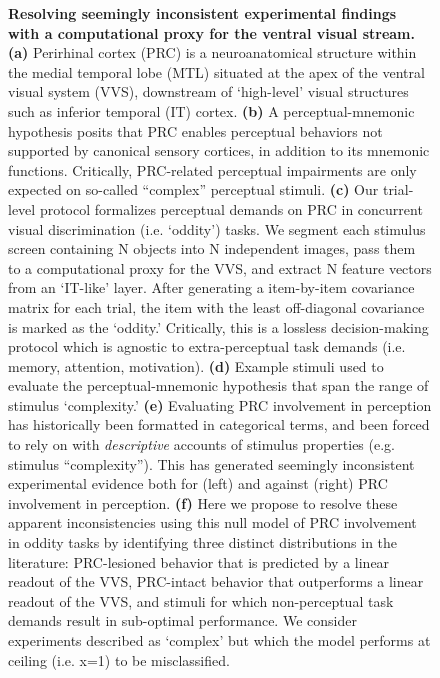 \documentclass[11pt]{article}
\begin{document}
\begin{figure}[ht]
\caption{\textbf{Resolving seemingly inconsistent experimental findings with a computational proxy for the ventral visual stream. (a)} Perirhinal cortex (PRC) is a neuroanatomical structure within the medial temporal lobe (MTL) situated at the apex of the ventral visual system (VVS), downstream of `high-level' visual structures such as inferior temporal (IT) cortex. \textbf{(b)} A perceptual-mnemonic hypothesis posits that PRC enables perceptual behaviors not supported by canonical sensory cortices, in addition to its mnemonic functions. Critically, PRC-related perceptual impairments are only expected on so-called ``complex'' perceptual stimuli. \textbf{(c)} Our trial-level protocol formalizes perceptual demands on PRC in concurrent visual discrimination (i.e. `oddity') tasks. We segment each stimulus screen containing N objects into N independent images, pass them to a computational proxy for the VVS, and extract N feature vectors from an `IT-like' layer. After generating a item-by-item covariance matrix for each trial, the item with the least off-diagonal covariance is marked as the `oddity.' Critically, this is a lossless decision-making protocol which is agnostic to extra-perceptual task demands (i.e. memory, attention, motivation). \textbf{(d)} Example stimuli used to evaluate the perceptual-mnemonic hypothesis that span the range of stimulus `complexity.' \textbf{(e)} Evaluating PRC involvement in perception has historically been formatted in categorical terms, and been forced to rely on with \emph{descriptive} accounts of stimulus properties (e.g. stimulus ``complexity''). This has generated seemingly inconsistent experimental evidence both for (left) and against (right) PRC involvement in perception. \textbf{(f)} Here we propose to resolve these apparent inconsistencies using this null model of PRC involvement in oddity tasks by identifying three distinct distributions in the literature: PRC-lesioned behavior that is predicted by a linear readout of the VVS, PRC-intact behavior that outperforms a linear readout of the VVS, and stimuli for which non-perceptual task demands result in sub-optimal performance. We consider experiments described as `complex' but which the model performs at ceiling (i.e. x=1) to be misclassified. }
\label{fig:PMA}
\end{figure}
\end{document}
